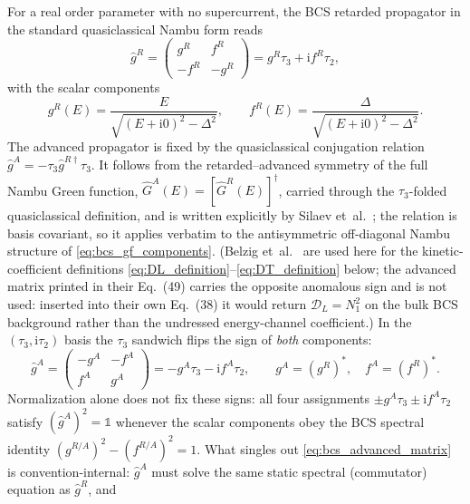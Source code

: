 \documentclass[
  aps,
  prb,
  preprint,
  superscriptaddress,
  longbibliography,
  nofootinbib
]{revtex4-2}
\newcommand{\ii}{\mathrm{i}}
\newcommand{\DOS}{N_1}
\providecommand{\openone}{}\renewcommand{\openone}{\mathds{1}}
\begin{document}
For a real order parameter with no supercurrent, the BCS retarded propagator
in the standard quasiclassical Nambu form reads
\begin{equation}
  \hat{g}^R
  =
  \begin{pmatrix}
    g^R & f^R \\ -f^R & -g^R
  \end{pmatrix}
  =
  g^R\tau_3 + \ii f^R\tau_2,
  \label{eq:bcs_gf_components}
\end{equation}
with the scalar components
\begin{equation}
  g^R(E)=\frac{E}{\sqrt{(E+\ii0)^2-\Delta^2}},
  \qquad
  f^R(E)=\frac{\Delta}{\sqrt{(E+\ii0)^2-\Delta^2}}.
  \label{eq:bcs_gf_scalars}
\end{equation}
The advanced propagator is fixed by the quasiclassical conjugation relation
\(\hat{g}^A=-\tau_3\hat{g}^{R\dagger}\tau_3\). It follows from the
retarded--advanced symmetry of the full Nambu Green function,
\(\hat{G}^A(E)=[\hat{G}^R(E)]^\dagger\), carried through the
\(\tau_3\)-folded quasiclassical definition, and is written explicitly by
Silaev et~al.~\cite{silaev2015}; the relation is basis covariant, so it
applies verbatim to the antisymmetric off-diagonal Nambu structure of
\cref{eq:bcs_gf_components}. (Belzig et~al.~\cite{belzig1999} are used
here for the kinetic-coefficient definitions
\cref{eq:DL_definition}--\cref{eq:DT_definition} below; the advanced
matrix printed in their Eq.~(49) carries the opposite anomalous sign and
is not used: inserted into their own Eq.~(38) it would return
\(\mathcal{D}_L=\DOS^2\) on the bulk BCS background rather than the
undressed energy-channel coefficient.) In the \((\tau_3,\ii\tau_2)\) basis the
\(\tau_3\) sandwich flips the sign of \emph{both} components:
\begin{equation}
  \hat{g}^A
  =
  \begin{pmatrix}
    -g^A & -f^A \\ f^A & g^A
  \end{pmatrix}
  =
  -g^A\tau_3 - \ii f^A\tau_2,
  \qquad
  g^A=(g^R)^{\ast},\quad
  f^A=(f^R)^{\ast}.
  \label{eq:bcs_advanced_matrix}
\end{equation}
Normalization alone does not fix these signs: all four assignments
\(\pm g^A\tau_3\pm\ii f^A\tau_2\) satisfy \((\hat{g}^A)^2=\openone\)
whenever the scalar components obey the BCS spectral identity
\((g^{R/A})^2-(f^{R/A})^2=1\). What singles out
\cref{eq:bcs_advanced_matrix} is convention-internal: \(\hat{g}^A\) must
solve the same static spectral (commutator) equation as \(\hat{g}^R\), and
\end{document}
